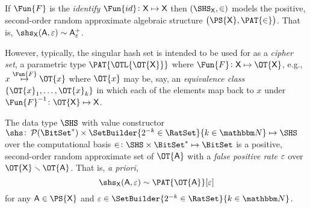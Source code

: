 \documentclass[ ../main.tex]{subfiles}
\begin{document}
If $\Fun{F}$ is the \emph{identify} $\Fun{id} \colon \Set{X} \mapsto \Set{X}$ then $\left(\SHS_{\Set{X}}, \SetContains\right)$ models the positive, second-order random approximate algebraic structure $\left(\PS{\Set{X}},\PAT{\SetContains}\right)$.
That is, $\shs_{\Set{X}}(\Set{A},\fprate) \sim \PASet{A}[\fprate]$.

However, typically, the singular hash set is intended to be used for as a \emph{cipher set}, a parametric type $\PAT{\OTL{\OT{\Set{X}}}}$ where $\Fun{F} \colon \Set{X} \mapsto \OT{\Set{X}}$, e.g., $x \overset{\Fun{F}}{\mapsto} \OT{x}$ where $\OT{x}$ may be, say, an \emph{equivalence class} $\{\OT{x}_1,\ldots,\OT{x}_k\}$ in which each of the elements map back to $x$ under $\Fun{F}^{-1} \colon \OT{\Set{X}} \mapsto \Set{X}$.

\begin{theorem}
The data type $\SHS$ with value constructor $\shs \colon \PowerSet(\BitSet^*) \times \SetBuilder{2^{-k} \in \RatSet}{k \in \NatSet} \mapsto \SHS$ over the computational basis $\SetContains \colon \SHS \times \BitSet^* \mapsto \BitSet$ is a positive, second-order random approximate set of $\OT{\Set{A}}$ with a \emph{false positive rate} $\varepsilon$ over $\OT{\Set{X}} \SetDiff \OT{\Set{A}}$.
That is, \emph{a priori},
\begin{equation}
	\shs_{\Set{X}}(\Set{A},\fprate) \sim \PAT{\OT{\Set{A}}}[\fprate]
\end{equation}
for any $\Set{A} \in \PS{\Set{X}}$ and $\fprate \in \SetBuilder{2^{-k} \in \RatSet}{k \in \NatSet}$.
\end{theorem}
\end{document}
